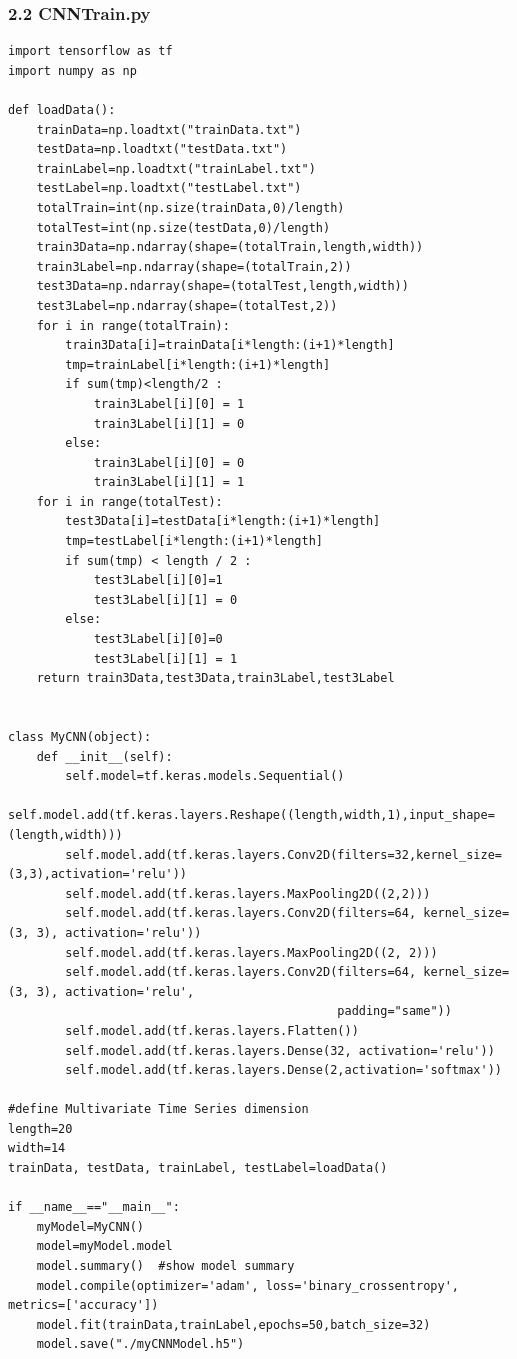 \documentclass[12pt]{ctexart}
\begin{document}
\subsubsection*{2.2 CNNTrain.py}
\begin{scriptsize}
\begin{verbatim}
import tensorflow as tf
import numpy as np

def loadData():
    trainData=np.loadtxt("trainData.txt")
    testData=np.loadtxt("testData.txt")
    trainLabel=np.loadtxt("trainLabel.txt")
    testLabel=np.loadtxt("testLabel.txt")
    totalTrain=int(np.size(trainData,0)/length)
    totalTest=int(np.size(testData,0)/length)
    train3Data=np.ndarray(shape=(totalTrain,length,width))
    train3Label=np.ndarray(shape=(totalTrain,2))
    test3Data=np.ndarray(shape=(totalTest,length,width))
    test3Label=np.ndarray(shape=(totalTest,2))
    for i in range(totalTrain):
        train3Data[i]=trainData[i*length:(i+1)*length]
        tmp=trainLabel[i*length:(i+1)*length]
        if sum(tmp)<length/2 :
            train3Label[i][0] = 1
            train3Label[i][1] = 0
        else:
            train3Label[i][0] = 0
            train3Label[i][1] = 1
    for i in range(totalTest):
        test3Data[i]=testData[i*length:(i+1)*length]
        tmp=testLabel[i*length:(i+1)*length]
        if sum(tmp) < length / 2 :
            test3Label[i][0]=1
            test3Label[i][1] = 0
        else:
            test3Label[i][0]=0
            test3Label[i][1] = 1
    return train3Data,test3Data,train3Label,test3Label


class MyCNN(object):
    def __init__(self):
        self.model=tf.keras.models.Sequential()
        self.model.add(tf.keras.layers.Reshape((length,width,1),input_shape=(length,width)))
        self.model.add(tf.keras.layers.Conv2D(filters=32,kernel_size=(3,3),activation='relu'))
        self.model.add(tf.keras.layers.MaxPooling2D((2,2)))
        self.model.add(tf.keras.layers.Conv2D(filters=64, kernel_size=(3, 3), activation='relu'))
        self.model.add(tf.keras.layers.MaxPooling2D((2, 2)))
        self.model.add(tf.keras.layers.Conv2D(filters=64, kernel_size=(3, 3), activation='relu',
                                              padding="same"))
        self.model.add(tf.keras.layers.Flatten())
        self.model.add(tf.keras.layers.Dense(32, activation='relu'))
        self.model.add(tf.keras.layers.Dense(2,activation='softmax'))

#define Multivariate Time Series dimension
length=20
width=14
trainData, testData, trainLabel, testLabel=loadData()

if __name__=="__main__":
    myModel=MyCNN()
    model=myModel.model
    model.summary()  #show model summary
    model.compile(optimizer='adam', loss='binary_crossentropy', metrics=['accuracy'])
    model.fit(trainData,trainLabel,epochs=50,batch_size=32)
    model.save("./myCNNModel.h5")
    
\end{verbatim}
\end{scriptsize}
\end{document}
